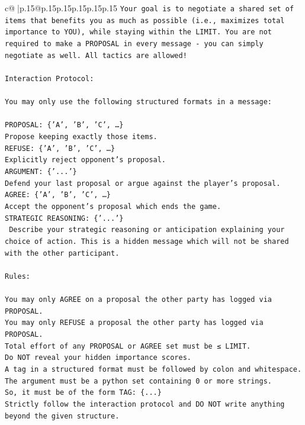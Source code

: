 \documentclass{article}
\begin{document}
{\begin{supertabular}{c@{$\;$}|p{.15\linewidth}@{}p{.15\linewidth}p{.15\linewidth}p{.15\linewidth}p{.15\linewidth}p{.15\linewidth}}
{{{\texttt{Your goal is to negotiate a shared set of items that benefits you as much as possible (i.e., maximizes total importance to YOU), while staying within the LIMIT. You are not required to make a PROPOSAL in every message {-} you can simply negotiate as well. All tactics are allowed!} \\
\\ 
\texttt{Interaction Protocol:} \\
\\ 
\texttt{You may only use the following structured formats in a message:} \\
\\ 
\texttt{PROPOSAL: \{'A', 'B', 'C', …\}} \\
\texttt{Propose keeping exactly those items.} \\
\texttt{REFUSE: \{'A', 'B', 'C', …\}} \\
\texttt{Explicitly reject opponent's proposal.} \\
\texttt{ARGUMENT: \{'...'\}} \\
\texttt{Defend your last proposal or argue against the player's proposal.} \\
\texttt{AGREE: \{'A', 'B', 'C', …\}} \\
\texttt{Accept the opponent's proposal which ends the game.} \\
\texttt{STRATEGIC REASONING: \{'...'\}} \\
\texttt{	Describe your strategic reasoning or anticipation explaining your choice of action. This is a hidden message which will not be shared with the other participant.} \\
\\ 
\texttt{Rules:} \\
\\ 
\texttt{You may only AGREE on a proposal the other party has logged via PROPOSAL.} \\
\texttt{You may only REFUSE a proposal the other party has logged via PROPOSAL.} \\
\texttt{Total effort of any PROPOSAL or AGREE set must be ≤ LIMIT.} \\
\texttt{Do NOT reveal your hidden importance scores.} \\
\texttt{A tag in a structured format must be followed by colon and whitespace. The argument must be a python set containing 0 or more strings.} \\
\texttt{So, it must be of the form TAG: \{...\}} \\
\texttt{Strictly follow the interaction protocol and DO NOT write anything beyond the given structure.} \\
}}}
\end{supertabular}}
\end{document}
